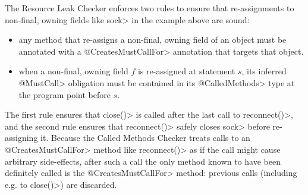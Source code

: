 The Resource Leak Checker enforces two rules to ensure that
re-assignments to non-final, owning fields like \<sock> in the example
above are sound:
\begin{itemize}
\item any method that re-assigns a non-final, owning field of an object
  must be annotated with a \<@CreatesMustCallFor> annotation
  that targets that object.
\item when a non-final, owning field $f$ is re-assigned at statement $s$,
  its inferred \<@MustCall> obligation must be contained in its \<@CalledMethods>
  type at the program point before $s$.
\end{itemize}
\noindent
The first rule ensures that \<close()> is called after the last call
to \<reconnect()>, and the second rule ensures that \<reconnect()>
safely closes \<sock> before re-assigning it. Because the Called Methods Checker
treats calls to an \<@CreatesMustCallFor> method like \<reconnect()> as if the call might
cause arbitrary side-effects, after such a call the only method known to have been
definitely called is the \<@CreatesMustCallFor> method: previous calls
(including e.g. to \<close()>) are discarded.


